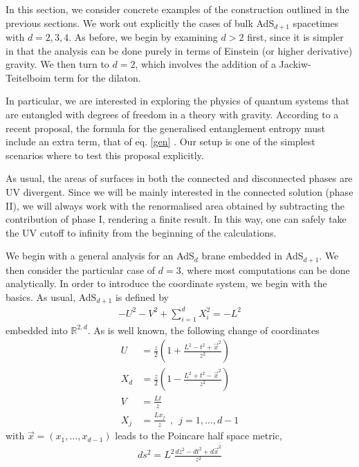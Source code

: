 


\rcm{*****************************}

In this section, we consider concrete examples of the construction outlined in the previous sections. We work out explicitly the cases of bulk AdS$_{d+1}$ spacetimes with $d=2,3,4$. As before, we begin by examining $d>2$ first, since it is simpler in that the analysis can be done purely in terms of Einstein (or higher derivative) gravity. We then turn to $d=2$, which involves the addition of a Jackiw-Teitelboim term for the dilaton.

In particular, we are interested in exploring the physics of quantum systems that are entangled with degrees of freedom in a theory with gravity. According to a recent proposal, the formula for the generalised entanglement entropy must include an extra term, that of eq. \eqref{gen} \cite{Almheiri:2019hni}. Our setup is one of the simplest scenarios where to test this proposal explicitly.

As usual, the areas of surfaces in both the connected and disconnected phases are UV divergent. Since we will be mainly interested in the connected solution (phase II), we will always work with the renormalised area obtained by subtracting the contribution of phase I, rendering a finite result. In this way, one can safely take the UV cutoff to infinity from the beginning of the calculations.

We begin with a general analysis for an AdS$_d$ brane embedded in AdS$_{d+1}$. We then consider the particular case of $d=3$, where most computations can be done analytically. In order to introduce the coordinate system, we begin with the basics. As usual, AdS$_{d+1}$ is defined by
\begin{align}\label{adsdef}
-U^2-V^2+\sum_{i=1}^{d} X_i^2=-L^2
\end{align}
embedded into $\mathbb R^{2,d}$. As is well known, the following change of coordinates
\begin{align}\label{}
U&=\frac{z}{2}\left( 1+\frac{L^2-t^2+\vec{x}^2}{z^2} \right) \\
X_{d}&= \frac{z}{2} \left( 1-\frac{L^2+t^2-\vec{x}^2}{z^2} \right) \\
V&=\frac{Lt}{z}\\
X_j&=\frac{Lx_j}{z}\ \ ,\ \ j=1,\hdots,d-1
\end{align}
with $\vec{x}=(x_1,\hdots,x_{d-1})$ leads to the Poincare half space metric,
\begin{align}\label{Poincare}
ds^2=L^2 \frac{dz^2-dt^2+ d\vec{x}^2}{z^2}
\end{align}

